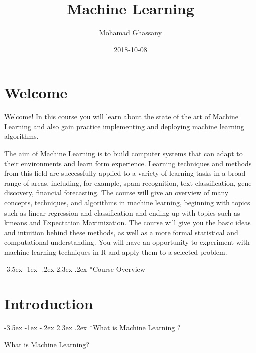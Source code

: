 \documentclass[]{book}
\title{Machine Learning}
\author{Mohamad Ghassany}
\date{2018-10-08}
\makeatletter
\renewcommand\section{\@startsection {section}{1}{\z@}%
                                   {-3.5ex \@plus -1ex \@minus -.2ex}%
                                   {2.3ex \@plus.2ex}%
                                   {\normalfont\Large\bfseries\color{ForestGreen}}}
\theoremstyle{definition}
\theoremstyle{definition}
\theoremstyle{definition}
\theoremstyle{remark}
\makeatother
\begin{document}
\maketitle

{
\setcounter{tocdepth}{2}
\tableofcontents
}
\chapter*{Welcome}\label{welcome}

Welcome! In this course you will learn about the state of the art of
Machine Learning and also gain practice implementing and deploying
machine learning algorithms.

The aim of Machine Learning is to build computer systems that can adapt
to their environments and learn form experience. Learning techniques and
methods from this field are successfully applied to a variety of
learning tasks in a broad range of areas, including, for example, spam
recognition, text classification, gene discovery, financial forecasting.
The course will give an overview of many concepts, techniques, and
algorithms in machine learning, beginning with topics such as linear
regression and classification and ending up with topics such as kmeans
and Expectation Maximization. The course will give you the basic ideas
and intuition behind these methods, as well as a more formal statistical
and computational understanding. You will have an opportunity to
experiment with machine learning techniques in R and apply them to a
selected problem.

\section*{Course Overview}\label{course-overview}

\chapter*{Introduction}\label{introduction}

\section*{What is Machine Learning ?}\label{what-is-machine-learning}

What is Machine Learning?
\end{document}
